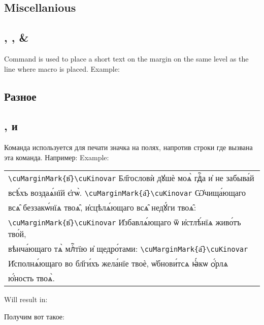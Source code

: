 \begin{EN}
\section{Miscellanious}
\subsection{, , \& }
Command  is used to place a short text on the margin on the same level as the line where macro is placed.
Example:
\end{EN}
%
\begin{RU}
\section{Разное}
\subsection{,  и }
Команда  используется для печати значка на полях, напротив строки где вызвана эта команда. Например:
Example:
\end{RU}
%
\begin{center}
\begin{churchslavonic}
\begin{tabular}{l}
  \verb+\cuMarginMark{+в҃\verb+}\cuKinovar+ Бл҃гословѝ дꙋшѐ моѧ̀ гдⷭ҇а и҆ не забыва́й\\
  всѣ́хъ воздаѧ́нїй є҆гѡ̀. \verb+\cuMarginMark{+а҃\verb+}\cuKinovar+ Ѡ҆чища́ющаго \\
  всѧ̑ беззакѡ́нїѧ твоѧ̑, и҆сцѣлѧ́ющаго  всѧ̑ недꙋ́ги твоѧ̑: \\
  \verb+\cuMarginMark{+в҃\verb+}\cuKinovar+ И҆збавлѧ́ющаго ѿ и҆стлѣ́нїѧ  живо́тъ тво́й,\\
  вѣнча́ющаго тѧ̀ млⷭ҇тїю и҆ щедро́тами: \verb+\cuMarginMark{+а҃\verb+}\cuKinovar+\\
  И҆сполнѧ́ющаго во бл҃ги́хъ жела́нїе твоѐ, ѡ҆бнови́тсѧ  ꙗ҆́кѡ ѻ҆́рлѧ \\
  ю҆́ность твоѧ̀.
\end{tabular}
\end{churchslavonic}
\end{center}

\begin{EN}
\noindent
Will result in:
\end{EN}
%
\begin{RU}
\noindent
Получим вот такое:
\end{RU}

